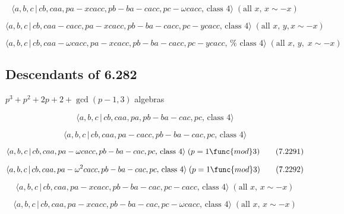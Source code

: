 \documentclass[10pt]{article}
\begin{document}
\begin{equation}
\langle a,b,c\,|\,cb,caa,pa-xcacc,pb-ba-cacc,pc-\omega cacc,\,\text{class }%
4\rangle \;(\text{all }x,\,x\sim -x)  \tag{7.2286}
\end{equation}

\begin{equation}
\langle a,b,c\,|\,cb,caa-cacc,pa-xcacc,pb-ba-cacc,pc-ycacc,\,\text{class }%
4\rangle \;(\text{all }x,\,y,x\sim -x)  \tag{7.2287}
\end{equation}

\begin{equation}
\langle a,b,c\,|\,cb,caa-\omega cacc,pa-xcacc,pb-ba-cacc,pc-ycacc,\,\text{%
class }4\rangle \;(\text{all }x,\,y,\;x\sim -x)  \tag{7.2288}
\end{equation}

\subsection{Descendants of 6.282}

$p^{3}+p^{2}+2p+2+\gcd (p-1,3)$ algebras

\begin{equation}
\langle a,b,c\,|\,cb,caa,pa,pb-ba-cac,pc,\,\text{class }4\rangle 
\tag{7.2289}
\end{equation}

\begin{equation}
\langle a,b,c\,|\,cb,caa,pa-cacc,pb-ba-cac,pc,\,\text{class }4\rangle 
\tag{7.2290}
\end{equation}

\begin{equation}
\langle a,b,c\,|\,cb,caa,pa-\omega cacc,pb-ba-cac,pc,\,\text{class }4\rangle
\;(p=1\func{mod}3)  \tag{7.2291}
\end{equation}

\begin{equation}
\langle a,b,c\,|\,cb,caa,pa-\omega ^{2}cacc,pb-ba-cac,pc,\,\text{class }%
4\rangle \;(p=1\func{mod}3)  \tag{7.2292}
\end{equation}

\begin{equation}
\langle a,b,c\,|\,cb,caa,pa-xcacc,pb-ba-cac,pc-cacc,\,\text{class }4\rangle
\;(\text{all }x,\,x\sim -x)  \tag{7.2293}
\end{equation}

\begin{equation}
\langle a,b,c\,|\,cb,caa,pa-xcacc,pb-ba-cac,pc-\omega cacc,\,\text{class }%
4\rangle \;(\text{all }x,\,x\sim -x)  \tag{7.2294}
\end{equation}
\end{document}
